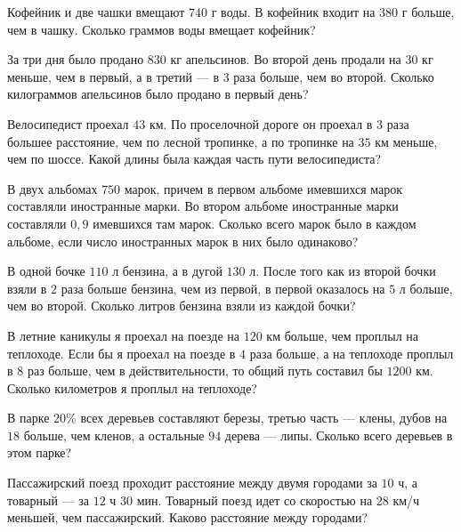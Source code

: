 \begin{consultation}
	\begin{listofex}
		\item Кофейник и две чашки вмещают \(740\) г воды. В кофейник входит на \(380\) г больше, чем в чашку. Сколько граммов воды вмещает кофейник?
		
		\item За три дня было продано \(830\) кг апельсинов. Во второй день продали на \(30\) кг меньше, чем в первый, а в третий --- в \(3\) раза больше, чем во второй. Сколько килограммов апельсинов было продано в первый день? 
		
		\item Велосипедист проехал \(43\) км. По проселочной дороге он проехал в \(3\) раза большее расстояние, чем по лесной тропинке, а по тропинке на \(35\) км меньше, чем по шоссе. Какой длины была каждая часть пути велосипедиста?
		
		\item В двух альбомах \(750\) марок, причем в первом альбоме имевшихся марок составляли иностранные марки. Во втором альбоме иностранные марки составляли \(0,9\) имевшихся там марок. Сколько всего марок было в каждом альбоме, если число иностранных марок в них было одинаково?
		
		\item В одной бочке \(110\) л бензина, а в дугой \(130\) л. После того как из второй бочки взяли в \(2\) раза больше бензина, чем из первой, в первой оказалось на \(5\) л больше, чем во второй. Сколько литров бензина взяли из каждой бочки? 
		
		\item В летние каникулы я проехал на поезде на \(120\) км больше, чем проплыл на теплоходе. Если бы я проехал на поезде в \(4\) раза больше, а на теплоходе проплыл в \(8\) раз больше, чем в действительности, то общий путь составил бы \(1200\) км. Сколько километров я проплыл на теплоходе?
		
		В парке \(20\%\) всех деревьев составляют березы, третью часть --- клены, дубов на \(18\) больше, чем кленов, а остальные \(94\) дерева --- липы. Сколько всего деревьев в этом парке? 
		
		\item Пассажирский поезд проходит расстояние между двумя городами за \(10\) ч, а товарный --- за \(12\) ч \(30\) мин. Товарный поезд идет со скоростью на \(28\) км/ч меньшей, чем пассажирский. Каково расстояние между городами?
	\end{listofex}
\end{consultation}
